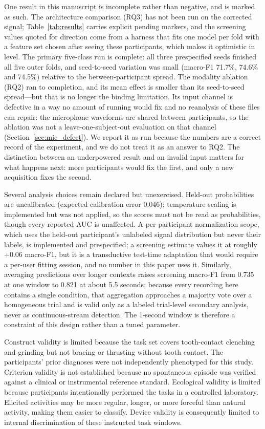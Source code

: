 \documentclass[pdflatex,sn-nature,iicol]{sn-jnl}
\begin{document}
One result in this manuscript is incomplete rather than negative, and is marked as such. The architecture comparison (RQ3) has not been run on the corrected signal; Table~\ref{tab:results} carries explicit pending markers, and the screening values quoted for direction come from a harness that fits one model per fold with a feature set chosen after seeing these participants, which makes it optimistic in level. The primary five-class run is complete: all three prespecified seeds finished all five outer folds, and seed-to-seed variation was small (macro-F1 71.7\%, 74.6\% and 74.5\%) relative to the between-participant spread. The modality ablation (RQ2) ran to completion, and its mean effect is smaller than its seed-to-seed spread---but that is no longer the binding limitation. Its input channel is defective in a way no amount of running would fix and no reanalysis of these files can repair: the microphone waveforms are shared between participants, so the ablation was not a leave-one-subject-out evaluation on that channel (Section~\ref{sec:mic_defect}). We report it as run because the numbers are a correct record of the experiment, and we do not treat it as an answer to RQ2. The distinction between an underpowered result and an invalid input matters for what happens next: more participants would fix the first, and only a new acquisition fixes the second.

Several analysis choices remain declared but unexercised. Held-out probabilities are uncalibrated (expected calibration error 0.046); temperature scaling is implemented but was not applied, so the scores must not be read as probabilities, though every reported AUC is unaffected. A per-participant normalization scope, which uses the held-out participant's unlabeled signal distribution but never their labels, is implemented and prespecified; a screening estimate values it at roughly $+0.06$ macro-F1, but it is a transductive test-time adaptation that would require a per-user fitting session, and no number in this paper uses it. Similarly, averaging predictions over longer contexts raises screening macro-F1 from 0.735 at one window to 0.821 at about 5.5 seconds; because every recording here contains a single condition, that aggregation approaches a majority vote over a homogeneous trial and is valid only as a labeled trial-level secondary analysis, never as continuous-stream detection. The 1-second window is therefore a constraint of this design rather than a tuned parameter.

Construct validity is limited because the task set covers tooth-contact clenching and grinding but not bracing or thrusting without tooth contact. The participants' prior diagnoses were not independently phenotyped for this study. Criterion validity is not established because no spontaneous episode was verified against a clinical or instrumental reference standard. Ecological validity is limited because participants intentionally performed the tasks in a controlled laboratory. Elicited activities may be more regular, longer, or more forceful than natural activity, making them easier to classify. Device validity is consequently limited to internal discrimination of these instructed task windows.
\end{document}
